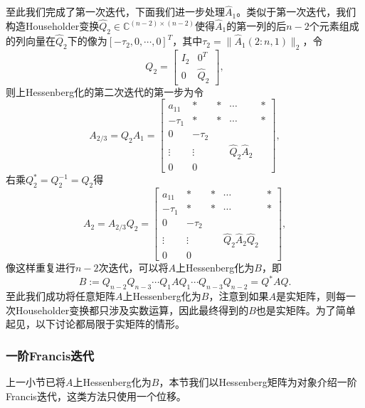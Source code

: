 \documentclass[a4paper,10pt]{ctexart}
\begin{document}
至此我们完成了第一次迭代，下面我们进一步处理$ \hat{A}_1 $。类似于第一次迭代，我们构造Householder变换$ \hat{Q}_2\in \mathbb{C}^{(n-2)\times (n-2)} $使得$ \hat{A}_1 $的第一列的后$ n-2 $个元素组成的列向量在$ \hat{Q}_2 $下的像为$ [-\tau_2,0,\cdots ,0]^T $，其中$ \tau_2 = \| \hat{A}_1(2:n,1) \|_2 $，令
\[
    Q_2 = 
    \begin{bmatrix} 
        I_{2} & 0^T \\
        0 & \hat{Q}_2
    \end{bmatrix},
\]
则上Hessenberg化的第二次迭代的第一步为令
\[
    A_{2 / 3} = Q_2 A_1 =
    \left[\begin{array}{c|c|ccc}
        a_{11} & * & * & \cdots  & *\\ \hline
        -\tau_1 & * & * & \cdots  & * \\ \hline 
        0 & -\tau_2 & & & \\
        \vdots & \vdots & & \hat{Q}_2 \hat{A}_2 & \\
        0 & 0 & & &
    \end{array}\right],
\]
右乘$ Q_2^* = Q_2^{-1} = Q_{2} $得
\[
    A_2 = A_{2 / 3}Q_2 = 
    \left[\begin{array}{c|c|ccc}
        a_{11} & * & * & \cdots  & *\\ \hline
        -\tau_1 & * & * & \cdots  & * \\ \hline 
        0 & -\tau_2 & & & \\
        \vdots & \vdots & & \hat{Q}_2\hat{A}_2 \hat{Q}_2 & \\
        0 & 0 & & &
    \end{array}\right],
\]
像这样重复进行$ n-2 $次迭代，可以将$ A $上Hessenberg化为$ B $，即
\[
    B := Q_{n-2}Q_{n-3}\cdots Q_1 A Q_1\cdots Q_{n-3}Q_{n-2} = Q^*AQ.
\]
至此我们成功将任意矩阵$ A $上Hessenberg化为$ B $，注意到如果$ A $是实矩阵，则每一次Householder变换都只涉及实数运算，因此最终得到的$ B $也是实矩阵。为了简单起见，以下讨论都局限于实矩阵的情形。

\subsubsection{一阶Francis迭代}
上一小节已将$ A $上Hessenberg化为$ B $，本节我们以Hessenberg矩阵为对象介绍一阶Francis迭代，这类方法只使用一个位移。
\end{document}
